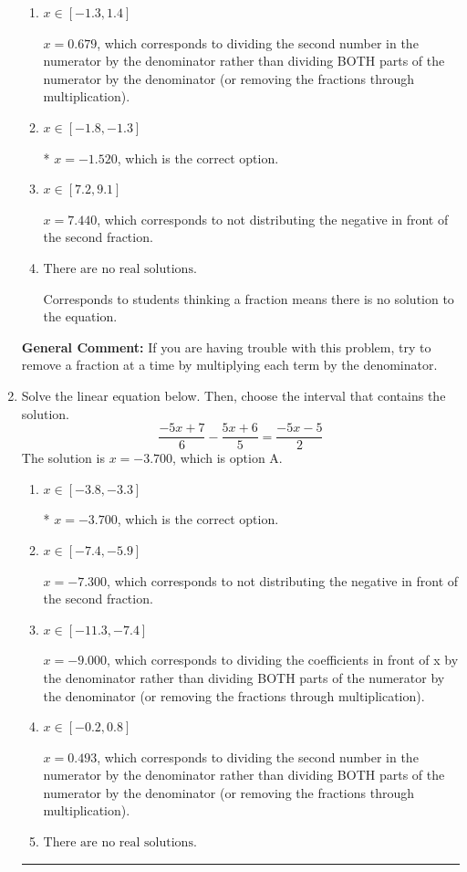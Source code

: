 \documentclass{extbook}[14pt]
\newcommand{\litem}[1]{\item #1

\rule{\textwidth}{0.4pt}}
\begin{document}
\begin{enumerate}
{\begin{enumerate}[label=\Alph*.]
 $x = 4.480$, which corresponds to dividing the coefficients in front of x by the denominator rather than dividing BOTH parts of the numerator by the denominator (or removing the fractions through multiplication).
\item \( x \in [-1.3, 1.4] \)

 $x = 0.679$, which corresponds to dividing the second number in the numerator by the denominator rather than dividing BOTH parts of the numerator by the denominator (or removing the fractions through multiplication).
\item \( x \in [-1.8, -1.3] \)

* $x = -1.520$, which is the correct option.
\item \( x \in [7.2, 9.1] \)

 $x = 7.440$, which corresponds to not distributing the negative in front of the second fraction.
\item \( \text{There are no real solutions.} \)

Corresponds to students thinking a fraction means there is no solution to the equation.
\end{enumerate}

\textbf{General Comment:} If you are having trouble with this problem, try to remove a fraction at a time by multiplying each term by the denominator.
}
\litem{
Solve the linear equation below. Then, choose the interval that contains the solution.
\[ \frac{-5x + 7}{6} - \frac{5x + 6}{5} = \frac{-5x -5}{2} \]The solution is \( x = -3.700 \), which is option A.\begin{enumerate}[label=\Alph*.]
\item \( x \in [-3.8, -3.3] \)

* $x = -3.700$, which is the correct option.
\item \( x \in [-7.4, -5.9] \)

 $x = -7.300$, which corresponds to not distributing the negative in front of the second fraction.
\item \( x \in [-11.3, -7.4] \)

 $x = -9.000$, which corresponds to dividing the coefficients in front of x by the denominator rather than dividing BOTH parts of the numerator by the denominator (or removing the fractions through multiplication).
\item \( x \in [-0.2, 0.8] \)

 $x = 0.493$, which corresponds to dividing the second number in the numerator by the denominator rather than dividing BOTH parts of the numerator by the denominator (or removing the fractions through multiplication).
\item \( \text{There are no real solutions.} \)


\end{enumerate}}
\end{enumerate}
\end{document}
